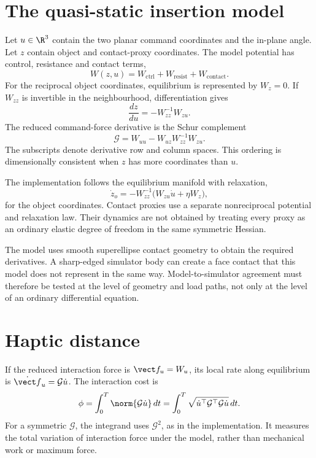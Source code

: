 \section{The quasi-static insertion model}

Let $u\in\R^3$ contain the two planar command coordinates and the in-plane angle. Let $z$ contain object and contact-proxy coordinates. The model potential has control, resistance and contact terms,
\begin{equation}
W(z,u)=W_{\mathrm{ctrl}}+W_{\mathrm{resist}}+W_{\mathrm{contact}}.
\end{equation}
For the reciprocal object coordinates, equilibrium is represented by $W_z=0$. If $W_{zz}$ is invertible in the neighbourhood, differentiation gives
\begin{equation}
\frac{dz}{du}=-W_{zz}^{-1}W_{zu}.
\end{equation}
The reduced command-force derivative is the Schur complement
\begin{equation}
\mathcal G=W_{uu}-W_{uz}W_{zz}^{-1}W_{zu}.
\label{eq:haptic-metric}
\end{equation}
The subscripts denote derivative row and column spaces. This ordering is dimensionally consistent when $z$ has more coordinates than $u$.

The implementation follows the equilibrium manifold with relaxation,
\begin{equation}
\dot z_o=-W_{zz}^{-1}\bigl(W_{zu}\dot u+\eta W_z\bigr),
\end{equation}
for the object coordinates. Contact proxies use a separate nonreciprocal potential and relaxation law. Their dynamics are not obtained by treating every proxy as an ordinary elastic degree of freedom in the same symmetric Hessian.

The model uses smooth superellipse contact geometry to obtain the required derivatives. A sharp-edged simulator body can create a face contact that this model does not represent in the same way. Model-to-simulator agreement must therefore be tested at the level of geometry and load paths, not only at the level of an ordinary differential equation.

\section{Haptic distance}

If the reduced interaction force is $\vect f_u=W_u$, its local rate along equilibrium is $\dot{\vect f}_u=\mathcal G\dot u$. The interaction cost is
\begin{equation}
\phi=\int_0^T\norm{\mathcal G\dot u}\,dt
=\int_0^T\sqrt{\dot u^\top\mathcal G^\top\mathcal G\dot u}\,dt.
\label{eq:haptic-distance}
\end{equation}
For a symmetric $\mathcal G$, the integrand uses $\mathcal G^2$, as in the implementation. It measures the total variation of interaction force under the model, rather than mechanical work or maximum force.

